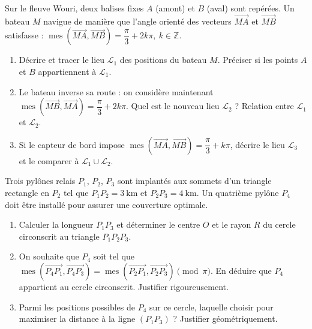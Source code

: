 \documentclass[11pt]{article}
\begin{document}
\begin{exercice}
Sur le fleuve Wouri, deux balises fixes $A$ (amont) et $B$ (aval) sont repérées. Un bateau $M$ navigue de manière que l'angle orienté des vecteurs $\overrightarrow{MA}$ et $\overrightarrow{MB}$ satisfasse : $\operatorname{mes}(\overrightarrow{MA}, \overrightarrow{MB}) = \dfrac{\pi}{3} + 2k\pi,\ k \in \mathbb{Z}$.
\begin{enumerate}
    \item Décrire et tracer le lieu $\mathcal{L}_1$ des positions du bateau $M$. Préciser si les points $A$ et $B$ appartiennent à $\mathcal{L}_1$.
    \item Le bateau inverse sa route : on considère maintenant $\operatorname{mes}(\overrightarrow{MB}, \overrightarrow{MA}) = \dfrac{\pi}{3} + 2k\pi$. Quel est le nouveau lieu $\mathcal{L}_2$ ? Relation entre $\mathcal{L}_1$ et $\mathcal{L}_2$.
    \item Si le capteur de bord impose $\operatorname{mes}(\overrightarrow{MA}, \overrightarrow{MB}) = \dfrac{\pi}{3} + k\pi$, décrire le lieu $\mathcal{L}_3$ et le comparer à $\mathcal{L}_1 \cup \mathcal{L}_2$.
\end{enumerate}
\end{exercice}

\begin{exercice}
Trois pylônes relais $P_1$, $P_2$, $P_3$ sont implantés aux sommets d'un triangle rectangle en $P_2$ tel que $P_1P_2 = \SI{3}{\kilo\meter}$ et $P_2P_3 = \SI{4}{\kilo\meter}$. Un quatrième pylône $P_4$ doit être installé pour assurer une couverture optimale.
\begin{enumerate}
    \item Calculer la longueur $P_1P_3$ et déterminer le centre $O$ et le rayon $R$ du cercle circonscrit au triangle $P_1P_2P_3$.
    \item On souhaite que $P_4$ soit tel que $\operatorname{mes}(\overrightarrow{P_4P_1}, \overrightarrow{P_4P_3}) = \operatorname{mes}(\overrightarrow{P_2P_1}, \overrightarrow{P_2P_3}) \pmod{\pi}$. En déduire que $P_4$ appartient au cercle circonscrit. Justifier rigoureusement.
    \item Parmi les positions possibles de $P_4$ sur ce cercle, laquelle choisir pour maximiser la distance à la ligne $(P_1P_3)$ ? Justifier géométriquement.
\end{enumerate}
\end{exercice}
\end{document}
